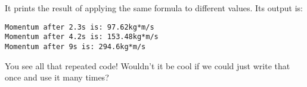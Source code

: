 \documentclass[]{book}
\begin{document}
\begin{minipage}{\linewidth}
\begin{minipage}[t]{.485\linewidth}
\begin{framed}
\end{framed}

\end{minipage}
\hfill
\begin{minipage}[t]{.485\linewidth}

It prints the result of applying the same formula to different values.
Its output is:

\begin{framed}

\begin{verbatim}
Momentum after 2.3s is: 97.62kg*m/s
Momentum after 4.2s is: 153.48kg*m/s
Momentum after 9s is: 294.6kg*m/s
\end{verbatim}

\end{framed}

You see all that repeated code! Wouldn't it be cool if we could just
write that once and use it many times?

\end{minipage}
\end{minipage}

\vspace{2mm}\noindent\hrulefill{}
\end{document}
